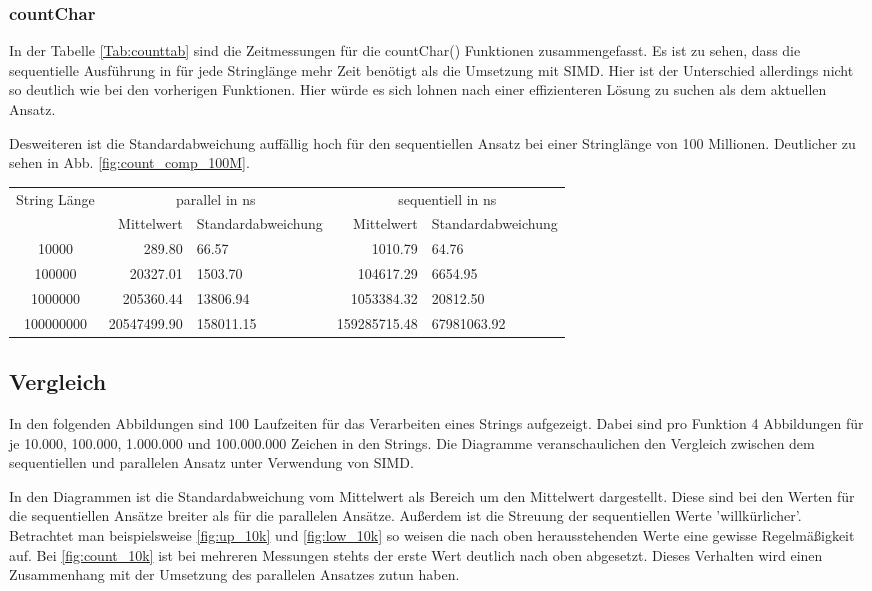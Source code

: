 \documentclass[plainarticle,zihtitle,german,final,hyperref,utf8]{zihpub}
\begin{document}
\subsubsection{countChar}
In der Tabelle \ref{Tab:counttab} sind die Zeitmessungen für die countChar() Funktionen zusammengefasst.
Es ist zu sehen, dass die sequentielle Ausführung in für jede Stringlänge mehr Zeit benötigt als die Umsetzung mit SIMD. Hier ist der Unterschied allerdings nicht so deutlich wie bei den vorherigen Funktionen. Hier würde es sich lohnen nach einer effizienteren Lösung zu suchen als dem aktuellen Ansatz.

Desweiteren ist die Standardabweichung auffällig hoch für den sequentiellen Ansatz bei einer Stringlänge von 100 Millionen. Deutlicher zu sehen in Abb. \ref{fig:count_comp_100M}.
\newline
\begin{tabular}{|c|r|l|r|l|}
	\hline
	\multicolumn{1}{|c|}{String Länge} & \multicolumn{2}{c|}{parallel in ns} & \multicolumn{2}{c|}{sequentiell in ns} \\
	\cline{2-5}
	& Mittelwert & Standardabweichung  & Mittelwert & Standardabweichung \\
	\hline
	10000 & 289.80 & 66.57 & 1010.79 & 64.76 \\
	100000 & 20327.01 & 1503.70 & 104617.29 & 6654.95 \\
	1000000 & 205360.44 & 13806.94 & 1053384.32 & 20812.50 \\
	100000000 & 20547499.90 & 158011.15 & 159285715.48 & 67981063.92 \\

	\hline
\end{tabular}
\label{Tab:counttab}

\newpage
\subsection{Vergleich}
In den folgenden Abbildungen sind 100 Laufzeiten für das Verarbeiten eines Strings aufgezeigt. Dabei sind pro Funktion 4 Abbildungen für je 10.000, 100.000, 1.000.000 und 100.000.000 Zeichen in den Strings. Die Diagramme veranschaulichen den Vergleich zwischen dem sequentiellen und parallelen Ansatz unter Verwendung von SIMD.

In den Diagrammen ist die Standardabweichung vom Mittelwert als Bereich um den Mittelwert dargestellt. Diese sind bei den Werten für die sequentiellen Ansätze breiter als für die parallelen Ansätze. Außerdem ist die Streuung der sequentiellen Werte 'willkürlicher'. Betrachtet man beispielsweise \ref{fig:up_10k} und \ref{fig:low_10k} so weisen die nach oben herausstehenden Werte eine gewisse Regelmäßigkeit auf. \newline
Bei \ref{fig:count_10k} ist bei mehreren Messungen stehts der erste Wert deutlich nach oben abgesetzt. Dieses Verhalten wird einen Zusammenhang mit der Umsetzung des parallelen Ansatzes zutun haben.
\end{document}
